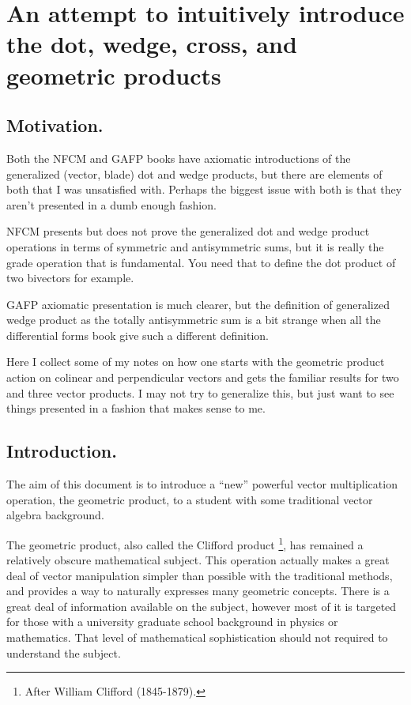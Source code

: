 \chapter{An attempt to intuitively introduce the dot, wedge, cross, and geometric products}

\date{ March 17, 2008.  $RCSfile: gaGradeDotWedge.tex,v $ Last $Revision: 1.8 $ $Date: 2009/06/11 16:45:58 $ }

\section{Motivation. }

Both the NFCM and GAFP books have axiomatic introductions of the 
generalized (vector, blade) dot and wedge products, but there are
elements of both that I was unsatisfied with.  Perhaps the biggest
issue with both is that they aren't presented in a dumb enough fashion.

NFCM presents but
does not prove the generalized dot and wedge product operations
in terms of symmetric and antisymmetric sums, but it is really the
grade operation that is fundamental.  You need that to define the
dot product of two bivectors for example.

GAFP axiomatic presentation is much clearer, but the definition of
generalized wedge product as the totally antisymmetric sum is a bit
strange when all the differential forms book give such a different
definition.

Here I collect some of my notes on how one starts with the geometric
product action on colinear and perpendicular vectors and gets the 
familiar results for two and three vector products.  I may not try to
generalize this, but just want to see things presented in a fashion
that makes sense to me.

\section{Introduction.}

The aim of this document is to introduce a ``new'' powerful vector multiplication operation, the geometric product,
to a student with some traditional vector algebra background.

The geometric product, also called the Clifford product 
\footnote{After William Clifford (1845-1879).}, has remained a relatively obscure mathematical subject. 
This operation actually makes a great deal of vector manipulation simpler than possible with the traditional methods, and
provides a way to naturally expresses many geometric concepts.
There is a great deal of information available on the subject, however most of it is targeted for those with a 
university graduate school background in physics or mathematics.  That level of mathematical sophistication
should not required to understand the subject.

